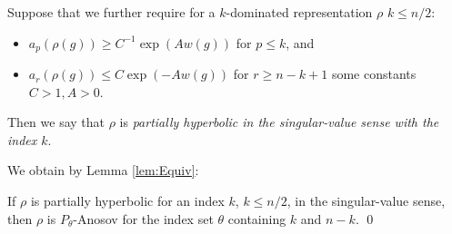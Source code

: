 



Suppose that we further require for a $k$-dominated representation $\rho$
  $k \leq n/2$\/: 
\begin{itemize}  
	\item $a_p(\rho(g)) \geq C^{-1} \exp(A w(g))$ for $p \leq k$, and 
	\item $a_r(\rho(g)) \leq C \exp(-A w(g))$ for $r \geq n-k+1$
	 some constants $C> 1, A> 0$. 
\end{itemize} 
Then we say that $\rho$ is {\em partially hyperbolic
	in the singular-value sense with the index $k$}. 
 
We obtain by Lemma \ref{lem:Equiv}:
\begin{lemma}\label{lem:phypAnos} 
	If $\rho$ is partially hyperbolic for an index $k$, $k \leq n/2$, in the singular-value sense, 
	then $\rho$ is $P_\theta$-Anosov for the index set $\theta$ containing $k$ and $n-k$. 
	\qed
\end{lemma} 

